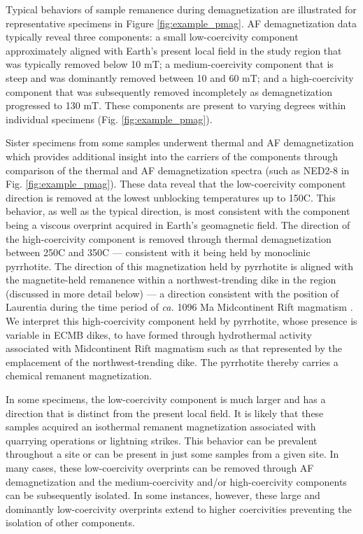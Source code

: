 \documentclass[draft]{agujournal2019}
\begin{document}
Typical behaviors of sample remanence during demagnetization are illustrated for representative specimens in Figure \ref{fig:example_pmag}. AF demagnetization data typically reveal three components: a small low-coercivity component approximately aligned with Earth's present local field in the study region that was typically removed below 10 mT; a medium-coercivity component that is steep and was dominantly removed between 10 and 60 mT; and a high-coercivity component that was subsequently removed incompletely as demagnetization progressed to 130 mT. These components are present to varying degrees within individual specimens (Fig. \ref{fig:example_pmag}).

Sister specimens from some samples underwent thermal and AF demagnetization which provides additional insight into the carriers of the components through comparison of the thermal and AF demagnetization spectra (such as NED2-8 in Fig. \ref{fig:example_pmag}). These data reveal that the low-coercivity component direction is removed at the lowest unblocking temperatures up to 150\textdegree C. This behavior, as well as the typical direction, is most consistent with the component being a viscous overprint acquired in Earth's geomagnetic field. The direction of the high-coercivity component is removed through thermal demagnetization between 250\textdegree C and 350\textdegree C --- consistent with it being held by monoclinic pyrrhotite. The direction of this magnetization held by pyrrhotite is aligned with the magnetite-held remanence within a northwest-trending dike in the region (discussed in more detail below) --- a direction consistent with the position of Laurentia during the time period of \textit{ca.} 1096 Ma Midcontinent Rift magmatism \cite{Swanson-Hysell2020a}. We interpret this high-coercivity component held by pyrrhotite, whose presence is variable in ECMB dikes, to have formed through hydrothermal activity associated with Midcontinent Rift magmatism such as that represented by the emplacement of the northwest-trending dike. The pyrrhotite thereby carries a chemical remanent magnetization.

In some specimens, the low-coercivity component is much larger and has a direction that is distinct from the present local field. It is likely that these samples acquired an isothermal remanent magnetization associated with quarrying operations or lightning strikes. This behavior can be prevalent throughout a site or can be present in just some samples from a given site. In many cases, these low-coercivity overprints can be removed through AF demagnetization and the medium-coercivity and/or high-coercivity components can be subsequently isolated. In some instances, however, these large and dominantly low-coercivity overprints extend to higher coercivities preventing the isolation of other components.
\end{document}
